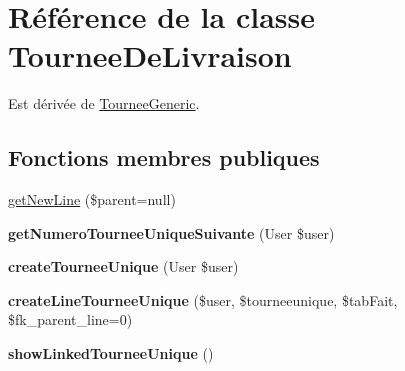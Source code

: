 \hypertarget{classTourneeDeLivraison}{}\section{Référence de la classe Tournee\+De\+Livraison}
\label{classTourneeDeLivraison}


Est dérivée de \hyperlink{classTourneeGeneric}{Tournee\+Generic}.

\subsection*{Fonctions membres publiques}
\begin{DoxyCompactItemize}
\item 
\hyperlink{classTourneeDeLivraison_a03a1ec4bd198c919fb2fb6935e96b82c}{get\+New\+Line} (\$parent=null)
\item 
\mbox{\label{classTourneeDeLivraison_a04af57e8cad542beb1ddab5a98b6b38f}} 
{\bfseries get\+Numero\+Tournee\+Unique\+Suivante} (User \$user)
\item 
\mbox{\label{classTourneeDeLivraison_a069c3bf7f208be123622e65e99ab7277}} 
{\bfseries create\+Tournee\+Unique} (User \$user)
\item 
\mbox{\label{classTourneeDeLivraison_abc4ee5b6c6897fbf1ca4416e3f78791d}} 
{\bfseries create\+Line\+Tournee\+Unique} (\$user, \$tourneeunique, \$tab\+Fait, \$fk\+\_\+parent\+\_\+line=0)
\item 
\mbox{\label{classTourneeDeLivraison_a605caffcc71c335a62450a2b469125e3}} 
{\bfseries show\+Linked\+Tournee\+Unique} ()
\end{DoxyCompactItemize}
